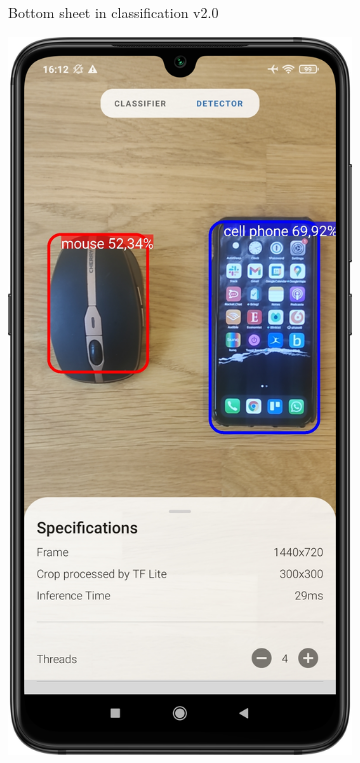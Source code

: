 \documentclass[
			   fontsize=11pt,
               paper=a4,
               bibliography=totoc,
               idxtotoc,
               headsepline,
               footsepline,
               footinclude=false,
               BCOR=12mm,
               DIV=13,
               openany,   %
               oneside    %
               ]
               {scrbook}
\begin{document}
\begin{figure}[H]
\begin{subfigure}{.23\textwidth}
		\caption[Screenshots of the new app in version 2.0 showing the classification activity with its bottom sheet expanded]{Bottom sheet in classification v2.0}
		\label{fig:appImage22}
	\end{subfigure} 
	\hfil
	\begin{subfigure}{.23\textwidth}
		\centering
		\includegraphics[width=\linewidth]{figures/app_detection_sheet_new.png}

\end{subfigure}
\end{figure}
\end{document}
